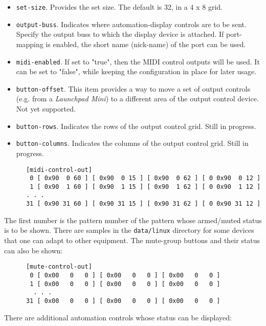    \begin{itemize}
      \item \texttt{set-size}.
         Provides the set size.  The default is 32, in a 4 x 8 grid.
      \item \texttt{output-buss}.
         Indicates where automation-display controls are to be sent.
         Specify the output buss to which the display device is attached. If
         port-mapping is enabled, the short name (nick-name) of the port can be
         used.
      \item \texttt{midi-enabled}.
         If set to "true", then the MIDI control outputs will be used.
         It can be set to "false", while keeping the configuration in place
         for later usage.
      \item \texttt{button-offset}.
         This item provides a way to move a set of output controls (e.g. from a
         \textsl{Launchpad Mini}) to a different area of the output control
         device.  Not yet supported.
      \item \texttt{button-rows}.
         Indicates the rows of the output control grid.
         Still in progress.
      \item \texttt{button-columns}.
         Indicates the columns of the output control grid.
         Still in progress.
   \end{itemize}

   \begin{verbatim}
      [midi-control-out]
       0 [ 0x90  0 60 ] [ 0x90  0 15 ] [ 0x90  0 62 ] [ 0 0x90  0 12 ]
       1 [ 0x90  1 60 ] [ 0x90  1 15 ] [ 0x90  1 62 ] [ 0 0x90  1 12 ]
      . . .
      31 [ 0x90 31 60 ] [ 0x90 31 15 ] [ 0x90 31 62 ] [ 0 0x90 31 12 ]
   \end{verbatim}

   The first number is the pattern number of the pattern whose armed/muted
   status is to be shown.
   There are samples in the \texttt{data/linux} directory for some devices that
   one can adapt to other equipment.
   The mute-group buttons and their status can also be shown:

   \begin{verbatim}
      [mute-control-out]
       0 [ 0x00   0   0 ] [ 0x00   0   0 ] [ 0x00   0   0 ]
       1 [ 0x00   0   0 ] [ 0x00   0   0 ] [ 0x00   0   0 ]
        . . .
      31 [ 0x00   0   0 ] [ 0x00   0   0 ] [ 0x00   0   0 ]
   \end{verbatim}

   There are additional automation controls whose status can be displayed:

